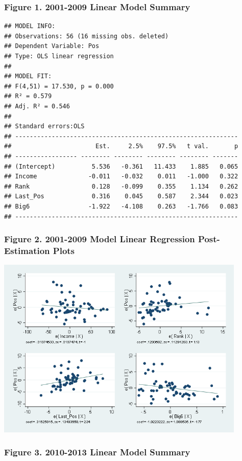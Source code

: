 \documentclass[
  12pt,
]{article}
\begin{document}
\subsubsection{Figure 1. 2001-2009 Linear Model
Summary}\label{figure-1.-2001-2009-linear-model-summary}

\begin{verbatim}
## MODEL INFO:
## Observations: 56 (16 missing obs. deleted)
## Dependent Variable: Pos
## Type: OLS linear regression 
## 
## MODEL FIT:
## F(4,51) = 17.530, p = 0.000
## R² = 0.579
## Adj. R² = 0.546 
## 
## Standard errors:OLS
## -------------------------------------------------------------
##                       Est.     2.5%    97.5%   t val.       p
## ----------------- -------- -------- -------- -------- -------
## (Intercept)          5.536   -0.361   11.433    1.885   0.065
## Income              -0.011   -0.032    0.011   -1.000   0.322
## Rank                 0.128   -0.099    0.355    1.134   0.262
## Last_Pos             0.316    0.045    0.587    2.344   0.023
## Big6                -1.922   -4.108    0.263   -1.766   0.083
## -------------------------------------------------------------
\end{verbatim}

\subsubsection{Figure 2. 2001-2009 Model Linear Regression
Post-Estimation
Plots}\label{figure-2.-2001-2009-model-linear-regression-post-estimation-plots}

\includegraphics[width=450px]{2009}

\newpage

\subsubsection{Figure 3. 2010-2013 Linear Model
Summary}\label{figure-3.-2010-2013-linear-model-summary}
\end{document}
